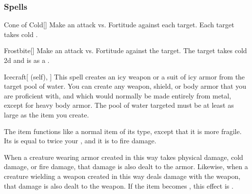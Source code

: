 \subsubsection{Spells}


\lowercase{\hypertarget{spell:Cone of Cold}{}}\label{spell:Cone of Cold}
\begin{freeability}[Rank 1]{\hypertarget{spell:Cone of Cold}{Cone of Cold}}[]
Make an attack vs. Fortitude against each target.
\hit Each target takes cold .
\end{freeability}
\vspace{0.25em}



\lowercase{\hypertarget{spell:Frostbite}{}}\label{spell:Frostbite}
\begin{freeability}[Rank 1]{\hypertarget{spell:Frostbite}{Frostbite}}[]
Make an attack vs. Fortitude against the target.
\hit The target takes cold  \minus2d and is  as a .
\end{freeability}
\vspace{0.25em}



\lowercase{\hypertarget{spell:Icecraft}{}}\label{spell:Icecraft}
\begin{attuneability}[Rank 1]{\hypertarget{spell:Icecraft}{Icecraft}}[ (self), ]
This spell creates an icy weapon or a suit of icy armor from the target pool of water.
You can create any weapon, shield, or body armor that you are proficient with, and which would normally be made entirely from metal, except for heavy body armor.
The pool of water targeted must be at least as large as the item you create.

The item functions like a normal item of its type, except that it is more fragile.
Its  is equal to twice your , and it is  to fire damage.

When a creature wearing armor created in this way takes physical damage, cold damage, or fire damage, that damage is also dealt to the armor.
Likewise, when a creature wielding a weapon created in this way deals damage with the weapon, that damage is also dealt to the weapon.
If the item becomes , this effect is .
\end{attuneability}
\vspace{0.25em}



